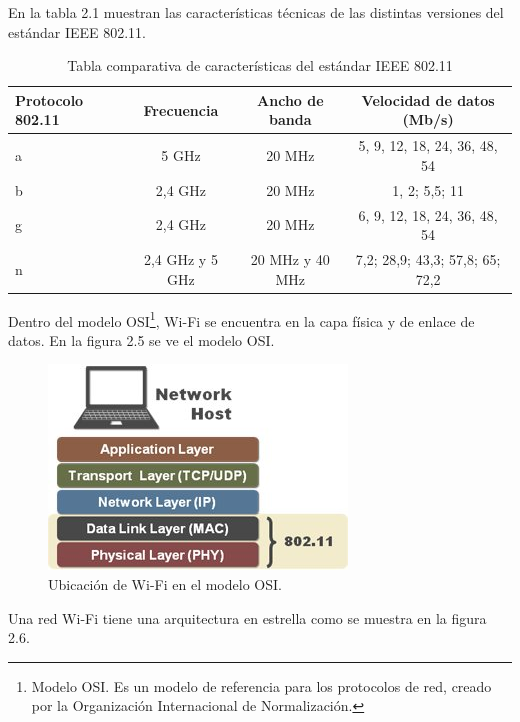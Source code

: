 En la tabla 2.1 muestran las características técnicas de las distintas versiones del estándar IEEE 802.11.

\begin{table}[h]
	\centering
	\caption[IEEE 802.11]{Tabla comparativa de características del estándar IEEE 802.11\protect\footnotemark}
	\begin{tabular}{l c c c}    
		\toprule
		\textbf{Protocolo 802.11} & \textbf{Frecuencia} & \textbf{Ancho de banda} & \textbf{Velocidad de datos (Mb/s)} \\
		\midrule
		a & 5 GHz 			& 20 MHz 		  & 5, 9, 12, 18, 24, 36, 48, 54 \\		
		b & 2,4 GHz			& 20 MHz 		  & 1, 2; 5,5; 11 \\
		g & 2,4 GHz			& 20 MHz          & 6, 9, 12, 18, 24, 36, 48, 54 \\
		n & 2,4 GHz y 5 GHz & 20 MHz y 40 MHz & 7,2; 28,9; 43,3; 57,8; 65; 72,2 \\
		\bottomrule
		\hline
	\end{tabular}
	\label{tab:peces}
\end{table}


Dentro del modelo OSI\footnote{Modelo OSI. Es un modelo de referencia para los protocolos de red, creado por la Organización Internacional de Normalización.}, Wi-Fi se encuentra en la capa física y de enlace de datos. En la figura 2.5 se ve el modelo OSI.
\begin{figure}[h]
	\centering
	\includegraphics[scale=0.8]{./Figures/osi_model.jpg}
	\caption{Ubicación de Wi-Fi en el modelo OSI\protect\footnotemark.}
	\label{fig:cuadradoAzul}
\end{figure}


Una red Wi-Fi tiene una arquitectura en estrella como se muestra en la figura 2.6. 

